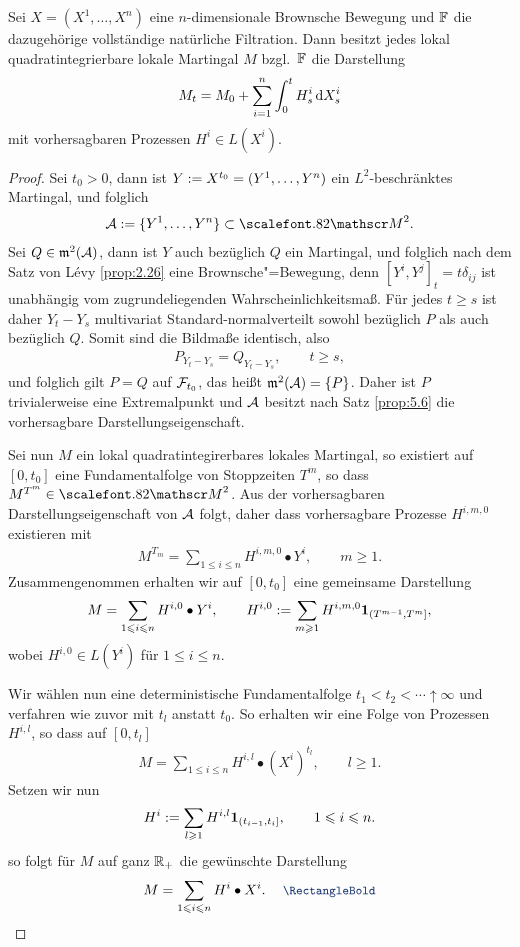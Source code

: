 \begin{theorem}
\label{rep-thm}
Sei $X=(X^1,\ldots,X^n)$ eine $n$-dimensionale Brownsche Bewegung und $\F$ die
dazugehörige vollständige natürliche Filtration. Dann besitzt jedes lokal
quadratintegrierbare lokale Martingal $M$ bzgl.\ $\F$ die Darstellung
\begin{align*}
M_t=M_0+ \sum_{i=1}^n \int_0^t H_s^i \,\diffd X_s^i
\end{align*}
mit vorhersagbaren Prozessen $H^i\in L(X^i)$.\fish
\end{theorem}
\begin{proof}
Sei $t_0 > 0$, dann ist $Y\defl X^{t_0}=(Y^1,\ldots,Y^n)$ ein $L^2$-beschränktes
Martingal, und folglich
\begin{align*}
\AA \defl \setd{Y^1,\ldots,Y^n}\subset\MM^2.
\end{align*}
Sei $Q\in\m^2(\AA)$, dann ist $Y$ auch bezüglich $Q$ ein Martingal, und folglich
nach dem Satz von L\'{e}vy \ref{prop:2.26} eine Brownsche"=Bewegung, denn
$[Y^i,Y^j]_t = t\delta_{ij}$ ist unabhängig vom zugrundeliegenden
Wahrscheinlichkeitsmaß.
Für jedes $t\ge s$ ist daher $Y_{t}-Y_s$ multivariat Standard-normalverteilt
sowohl bezüglich $P$ als auch bezüglich $Q$. Somit sind die Bildmaße identisch,
also
\begin{align*}
P_{Y_t-Y_s} = Q_{Y_t-Y_s},\qquad t\ge s,
\end{align*}
und folglich gilt $P = Q$ auf $\FF_{t_0}$, das heißt $\m^2(\AA) =\setd{P}$.
Daher ist $P$ trivialerweise eine Extremalpunkt und $\AA$ besitzt nach Satz
\ref{prop:5.6} die vorhersagbare Darstellungseigenschaft.

Sei nun $M$ ein lokal quadratintegirerbares lokales Martingal, so existiert auf
$[0,t_0]$ eine Fundamentalfolge von Stoppzeiten $T^m$, so dass
$M^{T^m}\in\MM^2$. Aus der vorhersagbaren Darstellungseigenschaft von $\AA$
folgt, daher dass vorhersagbare Prozesse $H^{i,m,0}$ existieren mit
\begin{align*}
M^{T_m} = \sum_{1\le i\le n} H^{i,m,0}\bullet Y^i,\qquad m\ge 1.
\end{align*}
Zusammengenommen erhalten wir auf $[0,t_0]$ eine gemeinsame Darstellung 
\begin{align*}
M = \sum_{1\le i\le n} H^{i,0}\bullet Y^i,\qquad H^{i,0} \defl \sum_{m\ge 1}
H^{i,m,0}\Id_{(T^{m-1},T^m]},
\end{align*}
wobei $H^{i,0}\in L(Y^i)$ für $1\le i\le n$.

Wir wählen nun eine deterministische Fundamentalfolge $t_1 < t_2 < \dotsm
\uparrow \infty$ und verfahren wie zuvor mit $t_l$ anstatt $t_0$. So erhalten
wir eine Folge von Prozessen $H^{i,l}$, so dass auf $[0,t_l]$
\begin{align*}
M = \sum_{1\le i\le n} H^{i,l}\bullet (X^i)^{t_l},\qquad l\ge 1.
\end{align*}
Setzen wir nun
\begin{align*}
H^i \defl \sum_{l\ge 1} H^{i,l}\Id_{(t_{i-1},t_i]},\qquad 1\le i\le n. 
\end{align*}
so folgt für $M$ auf ganz $\R_+$ die gewünschte Darstellung
\begin{align*}
M = \sum_{1\le i\le n} H^i\bullet X^i.\qed
\end{align*}
\end{proof}

